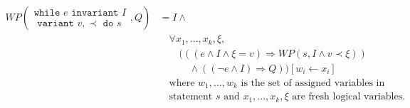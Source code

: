 \begin{align*}
	WP\left(
     \begin{array}{c}
     \texttt{while } e \texttt{ invariant } I \\
     \texttt{ variant } v, \prec \texttt{ do } s
     \end{array}
    , Q \right) 
    &= 
		I \land \\
    &\quad \forall x_1, ..., x_k, \xi, \\
    &\quad \quad (((e \land I \land \xi = v) \Rightarrow WP(s, I \land v \prec \xi)) \\
    &\quad \quad \quad \land ((\neg e \land I) \Rightarrow Q)) [w_i \leftarrow x_i] \\
	&\quad \text{where } w_1, ..., w_k \text{ is the set of assigned variables in} \\
  &\quad \text{statement } s \text{ and } x_1, ..., x_k, \xi \text{ are fresh logical variables.}
\end{align*}






